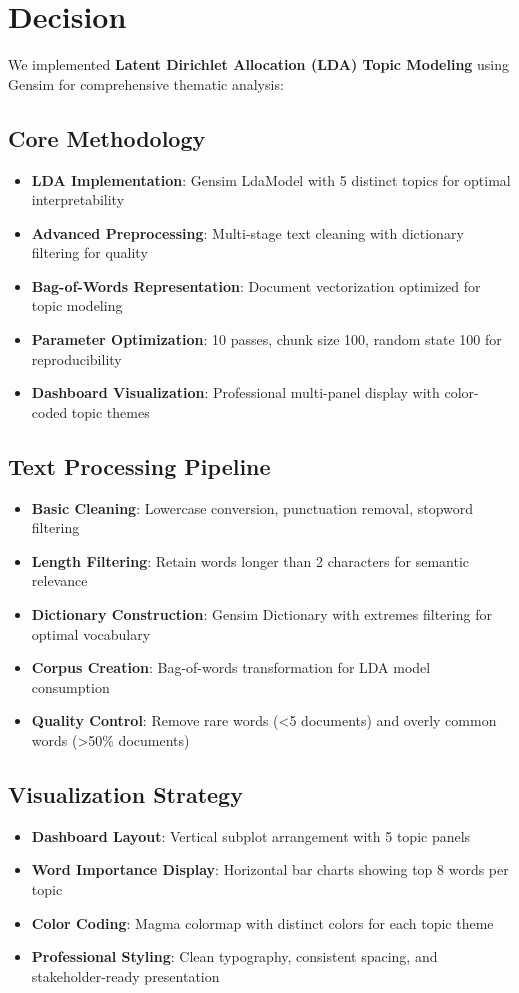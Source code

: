 \documentclass[11pt]{article}
\begin{document}
\section{Decision}

We implemented \textbf{Latent Dirichlet Allocation (LDA) Topic Modeling} using Gensim for comprehensive thematic analysis:

\subsection{Core Methodology}
\begin{itemize}
\item \textbf{LDA Implementation}: Gensim LdaModel with 5 distinct topics for optimal interpretability
\item \textbf{Advanced Preprocessing}: Multi-stage text cleaning with dictionary filtering for quality
\item \textbf{Bag-of-Words Representation}: Document vectorization optimized for topic modeling
\item \textbf{Parameter Optimization}: 10 passes, chunk size 100, random state 100 for reproducibility
\item \textbf{Dashboard Visualization}: Professional multi-panel display with color-coded topic themes
\end{itemize}

\subsection{Text Processing Pipeline}
\begin{itemize}
\item \textbf{Basic Cleaning}: Lowercase conversion, punctuation removal, stopword filtering
\item \textbf{Length Filtering}: Retain words longer than 2 characters for semantic relevance
\item \textbf{Dictionary Construction}: Gensim Dictionary with extremes filtering for optimal vocabulary
\item \textbf{Corpus Creation}: Bag-of-words transformation for LDA model consumption
\item \textbf{Quality Control}: Remove rare words (<5 documents) and overly common words (>50\% documents)
\end{itemize}

\subsection{Visualization Strategy}
\begin{itemize}
\item \textbf{Dashboard Layout}: Vertical subplot arrangement with 5 topic panels
\item \textbf{Word Importance Display}: Horizontal bar charts showing top 8 words per topic
\item \textbf{Color Coding}: Magma colormap with distinct colors for each topic theme
\item \textbf{Professional Styling}: Clean typography, consistent spacing, and stakeholder-ready presentation
\end{itemize}
\end{document}
